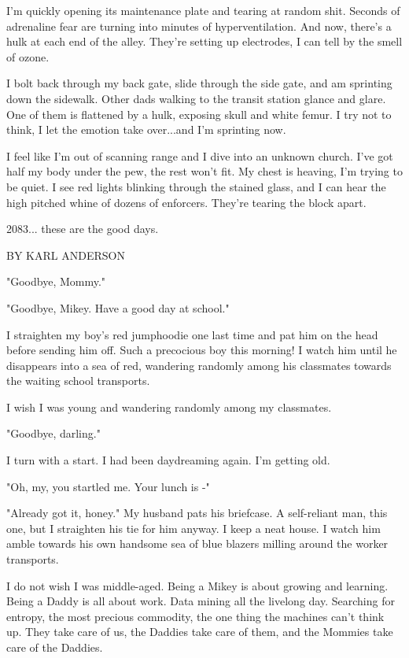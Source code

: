 \documentclass{amsbook}
\begin{document}
I'm quickly opening its maintenance plate and tearing at random shit.  Seconds of adrenaline fear are turning into minutes of hyperventilation.  And now, there's a hulk at each end of the alley.  They're setting up electrodes, I can tell by the smell of ozone.

I bolt back through my back gate, slide through the side gate, and am sprinting down the sidewalk.  Other dads walking to the transit station glance and glare.  One of them is flattened by a hulk, exposing skull and white femur.  I try not to think, I let the emotion take over...and I'm sprinting now.

I feel like I'm out of scanning range and I dive into an unknown church.  I've got half my body under the pew, the rest won't fit.  My chest is heaving, I'm trying to be quiet.  I see red lights blinking through the stained glass, and I can hear the high pitched whine of dozens of enforcers.  They're tearing the block apart.

2083... these are the good days.
\clearpage

{\ROBOFONTx BY KARL ANDERSON}
\vskip 36pt

"Goodbye, Mommy."

"Goodbye, Mikey.  Have a good day at school."

I straighten my boy's red jumphoodie one last time and pat him on the head before sending him off.  Such a precocious boy this morning!  I watch him until he disappears into a sea of red, wandering randomly among his classmates towards the waiting school transports.

I wish I was young and wandering randomly among my classmates.

"Goodbye, darling."

I turn with a start.  I had been daydreaming again.  I'm getting old.

"Oh, my, you startled me.  Your lunch is -"

"Already got it, honey."  My husband pats his briefcase.  A self-reliant man, this one, but I straighten his tie for him anyway.  I keep a neat house.  I watch him amble towards his own handsome sea of blue blazers milling around the worker transports.

I do not wish I was middle-aged.  Being a Mikey is about growing and learning.  Being a Daddy is all about work.  Data mining all the livelong day.  Searching for entropy, the most precious commodity, the one thing the machines can't think up.  They take care of us, the Daddies take care of them, and the Mommies take care of the Daddies.
\end{document}
